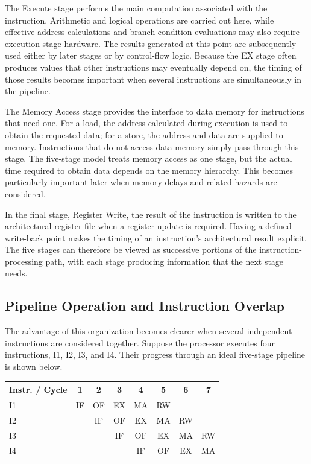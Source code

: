 \documentclass[11pt,a4paper]{report}
\begin{document}
The Execute stage performs the main computation associated with the instruction. Arithmetic and logical operations are carried out here, while effective-address calculations and branch-condition evaluations may also require execution-stage hardware. The results generated at this point are subsequently used either by later stages or by control-flow logic. Because the EX stage often produces values that other instructions may eventually depend on, the timing of those results becomes important when several instructions are simultaneously in the pipeline.

The Memory Access stage provides the interface to data memory for instructions that need one. For a load, the address calculated during execution is used to obtain the requested data; for a store, the address and data are supplied to memory. Instructions that do not access data memory simply pass through this stage. The five-stage model treats memory access as one stage, but the actual time required to obtain data depends on the memory hierarchy. This becomes particularly important later when memory delays and related hazards are considered.

In the final stage, Register Write, the result of the instruction is written to the architectural register file when a register update is required. Having a defined write-back point makes the timing of an instruction's architectural result explicit. The five stages can therefore be viewed as successive portions of the instruction-processing path, with each stage producing information that the next stage needs.~\cite{sarangi}

\subsection{Pipeline Operation and Instruction Overlap}

The advantage of this organization becomes clearer when several independent instructions are considered together. Suppose the processor executes four instructions, I1, I2, I3, and I4. Their progress through an ideal five-stage pipeline is shown below.

\begin{center}
\begin{tabular}{lccccccc}
\toprule
Instr. / Cycle & 1 & 2 & 3 & 4 & 5 & 6 & 7 \\
\midrule
I1 & IF & OF & EX & MA & RW & & \\
I2 & & IF & OF & EX & MA & RW & \\
I3 & & & IF & OF & EX & MA & RW \\
I4 & & & & IF & OF & EX & MA \\
\bottomrule
\end{tabular}
\end{center}
\end{document}
